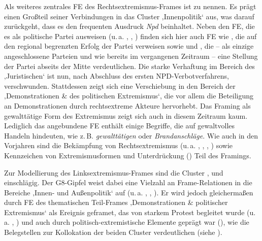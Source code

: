 Als weiteres zentrales FE des Rechtsextremismus-Frames ist  zu nennen. Es prägt einen Großteil seiner Verbindungen in das Cluster ‚Innenpolitik` aus, was darauf zurückgeht, dass es den frequenten Ausdruck \emph{Npd} beinhaltet. Neben den FE, die es als politische Partei ausweisen (u.\,a. , , ) finden sich hier auch FE wie , die auf den regional begrenzten Erfolg der Partei verweisen sowie  und , die -- als einzige angeschlossene Parteien und wie bereits im vergangenen Zeitraum -- eine Stellung der Partei abseits der Mitte verdeutlichen. Die starke Verhaftung im Bereich des ‚Juristischen` ist nun, nach Abschluss des ersten NPD-Verbotverfahrens, verschwunden. Stattdessen zeigt sich eine Verschiebung in den Bereich der ‚Demonstrationen \& des politischen Extremismus`, die vor allem die Beteiligung an Demonstrationen durch rechtsextreme Akteure hervorhebt. Das Framing als gewalttätige Form des Extremismus zeigt sich auch in diesem Zeitraum kaum. Lediglich das angebundene FE  enthält einige Begriffe, die auf gewaltvolles Handeln hindeuten, wie z.\,B. \emph{gewalttätigen} oder \emph{Brandanschläge}. Wie auch in den Vorjahren sind die Bekämpfung von Rechtsextremismus (u.\,a. , , , ) sowie Kennzeichen von Extremismusformen und Unterdrückung () Teil des Framings.

Zur Modellierung des Linksextremismus-Frames sind die Cluster ,  und  einschlägig. Der G8-Gipfel weist dabei eine Vielzahl an Frame-Relationen in die Bereiche ‚Innen- und Außenpolitik` auf (u.\,a. , , ). Er wird jedoch gleichermaßen durch FE des thematischen Teil-Frames ‚Demonstrationen \& politischer Extremismus` als Ereignis geframet, das von starkem Protest begleitet wurde (u.\,a. , ) und auch durch politisch-extremistische Elemente geprägt war (), wie die Belegstellen zur Kollokation der beiden Cluster verdeutlichen (siehe ).

